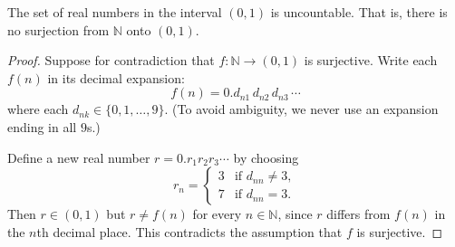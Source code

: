 \begin{theorem}
\label{thm:diagonal}
The set of real numbers in the interval $(0,1)$ is uncountable. That is, there is no surjection from $\mathbb{N}$ onto $(0,1)$.
\end{theorem}

\begin{proof}
Suppose for contradiction that $f \colon \mathbb{N} \to (0,1)$ is surjective. Write each $f(n)$ in its decimal expansion:
\[
    f(n) = 0.d_{n1}\, d_{n2}\, d_{n3}\, \cdots
\]
where each $d_{nk} \in \{0, 1, \ldots, 9\}$. (To avoid ambiguity, we never use an expansion ending in all $9$s.)

Define a new real number $r = 0.r_1 r_2 r_3 \cdots$ by choosing
\[
    r_n = \begin{cases} 3 & \text{if } d_{nn} \neq 3, \\ 7 & \text{if } d_{nn} = 3. \end{cases}
\]
Then $r \in (0,1)$ but $r \neq f(n)$ for every $n \in \mathbb{N}$, since $r$ differs from $f(n)$ in the $n$th decimal place. This contradicts the assumption that $f$ is surjective.
\end{proof}

